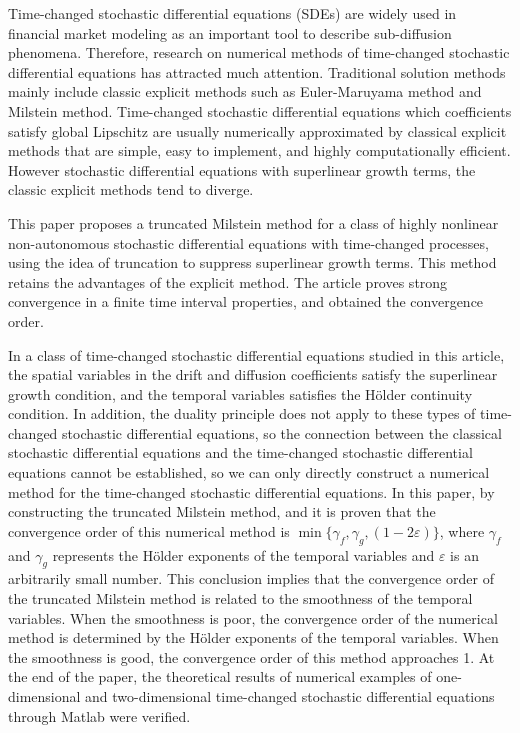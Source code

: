 

\begin{enabstract}
Time-changed stochastic differential equations (SDEs) are widely used in financial market modeling as an important tool to describe sub-diffusion phenomena. Therefore, research on numerical methods of time-changed stochastic differential equations has attracted much attention. Traditional solution methods mainly include classic explicit methods such as Euler-Maruyama method and Milstein method. Time-changed stochastic differential equations which coefficients satisfy global Lipschitz are usually numerically approximated by classical explicit methods that are simple, easy to implement, and highly computationally efficient. However stochastic differential equations with superlinear growth terms, the classic explicit methods tend to diverge.

This paper proposes a truncated Milstein method for a class of highly nonlinear non-autonomous stochastic differential equations with time-changed processes, using the idea of truncation to suppress superlinear growth terms. This method retains the advantages of the explicit method. The article proves strong convergence in a finite time interval properties, and obtained the convergence order. 

In a class of time-changed stochastic differential equations studied in this article, the spatial variables in the drift and diffusion coefficients satisfy the superlinear growth condition, and the temporal variables satisfies the H{\"o}lder continuity condition. In addition, the duality principle does not apply to these types of time-changed stochastic differential equations, so the connection between the classical stochastic differential equations and the time-changed stochastic differential equations cannot be established, so we can only directly construct a numerical method for the time-changed stochastic differential equations. In this paper, by constructing the truncated Milstein method,
and it is proven that the convergence order of this numerical method is ${\min\{\gamma_f,\gamma_g,(1-2\varepsilon)\}}$, where $\gamma_f$ and $\gamma_g$ represents the H{\"o}lder exponents of the temporal variables and $\varepsilon$ is an arbitrarily small number. This conclusion implies that the convergence order of the truncated Milstein method is related to the smoothness of the temporal variables. When the smoothness is poor, the convergence order of the numerical method is determined by the H{\"o}lder exponents of the temporal variables. When the smoothness is good, the convergence order of this method approaches 1. At the end of the paper, the theoretical results of numerical examples of one-dimensional and two-dimensional time-changed stochastic differential equations through Matlab were verified.


\end{enabstract}

